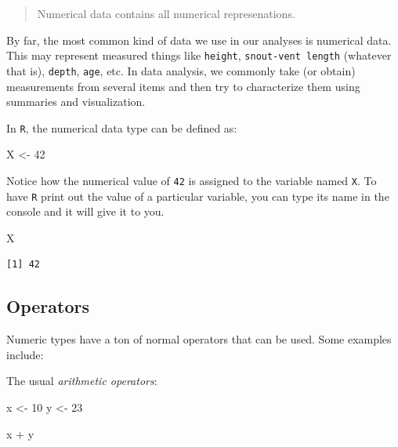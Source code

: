 \documentclass[
  letterpaper,
]{book}
\newenvironment{Shaded}{\begin{snugshade}}{\end{snugshade}}
\newcommand{\DecValTok}[1]{\textcolor[rgb]{0.68,0.00,0.00}{#1}}
\newcommand{\NormalTok}[1]{\textcolor[rgb]{0.00,0.23,0.31}{#1}}
\newcommand{\OtherTok}[1]{\textcolor[rgb]{0.00,0.23,0.31}{#1}}
\newcommand{\SpecialCharTok}[1]{\textcolor[rgb]{0.37,0.37,0.37}{#1}}
\begin{document}
\begin{quote}
Numerical data contains all numerical represenations.
\end{quote}

By far, the most common kind of data we use in our analyses is numerical
data. This may represent measured things like \texttt{height},
\texttt{snout-vent\ length} (whatever that is), \texttt{depth},
\texttt{age}, etc. In data analysis, we commonly take (or obtain)
measurements from several items and then try to characterize them using
summaries and visualization.

In \texttt{R}, the numerical data type can be defined as:

\begin{Shaded}
\begin{Highlighting}[]
\NormalTok{X }\OtherTok{\textless{}{-}} \DecValTok{42}
\end{Highlighting}
\end{Shaded}

Notice how the numerical value of \texttt{42} is assigned to the
variable named \texttt{X}. To have \texttt{R} print out the value of a
particular variable, you can type its name in the console and it will
give it to you.

\begin{Shaded}
\begin{Highlighting}[]
\NormalTok{X}
\end{Highlighting}
\end{Shaded}

\begin{verbatim}
[1] 42
\end{verbatim}

\subsection{Operators}\label{operators}

Numeric types have a ton of normal operators that can be used. Some
examples include:

The usual \emph{arithmetic operators}:

\begin{Shaded}
\begin{Highlighting}[]
\NormalTok{x }\OtherTok{\textless{}{-}} \DecValTok{10}
\NormalTok{y }\OtherTok{\textless{}{-}} \DecValTok{23}

\NormalTok{x }\SpecialCharTok{+}\NormalTok{ y}
\end{Highlighting}
\end{Shaded}
\end{document}
